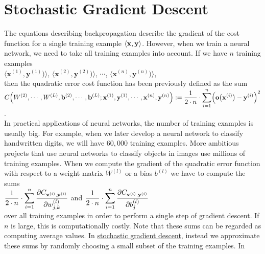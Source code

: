 \section{Stochastic Gradient Descent}
The equations describing backpropagation describe the gradient of the cost function for a single training
example $\pair(\mathbf{x}, \mathbf{y})$.  However, when we train a neural network, we need to take all training
examples into account.  If we have $n$ training examples
\\[0.2cm]
\hspace*{1.3cm}
$\langle\mathbf{x}^{(1)}, \mathbf{y}^{(1)})\rangle$,
$\langle\mathbf{x}^{(2)}, \mathbf{y}^{(2)})\rangle$,
$\cdots$,
$\langle\mathbf{x}^{(n)}, \mathbf{y}^{(n)})\rangle$,
\\[0.2cm]
then the quadratic error cost function has been previously defined as the sum
\\[0.2cm]
\hspace*{1.3cm}
$\displaystyle C\Bigr(W^{(2)}, \cdots, W^{(L)}, \mathbf{b}^{(2)}, \cdots, \mathbf{b}^{(L)};
     \mathbf{x}^{(1)}, \mathbf{y}^{(1)}, \cdots, \mathbf{x}^{(n)},\mathbf{y}^{(n)} \Bigr) := 
 \frac{1}{2 \cdot n} \cdot \sum\limits_{i=1}^n \Bigl(\mathbf{o}\bigl(\mathbf{x}^{(i)}\bigr) - \mathbf{y}^{(i)}\Bigr)^2
$.
\\[0.2cm]
In practical applications of neural networks, the number of training examples is usually big.  For example, 
when we later develop a neural network to classify handwritten digits, we will have $60,000$ training examples.  More
ambitious projects that use neural networks to classify objects in images use millions of training examples.
When we compute the gradient of the quadratic error function with respect to a weight matrix $W^{(l)}$ or a bias $b^{(l)}$ we
have to compute the sums 
\\[0.2cm]
\hspace*{1.3cm}
$\displaystyle \frac{1}{2\cdot n} \cdot \sum\limits_{i=1}^n \frac{\partial C_{\mathbf{x}^{(i)}, \mathbf{y}^{(i)}}}{\partial w_{j,k}^{(l)}}$
\quad and \quad
$\displaystyle \frac{1}{2\cdot n} \cdot \sum\limits_{i=1}^n \frac{\partial C_{\mathbf{x}^{(i)}, \mathbf{y}^{(i)}}}{\partial b_{j}^{(l)}}$
\\[0.2cm]
over all training examples in order to perform a single step of gradient descent.  If $n$ is large, this is
computationally costly.  Note that these sums can be regarded as computing average values.  In 
\href{https://en.wikipedia.org/wiki/Stochastic_gradient_descent}{stochastic gradient descent}, 
instead we approximate these sums by randomly choosing a small subset of the training examples.  In
